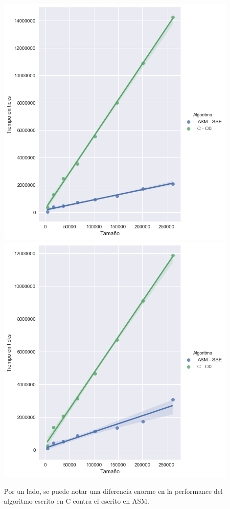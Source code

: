 \begin{center}
\includegraphics[scale=0.5]{img/rgb2yuv_CvsASM.png}
\includegraphics[scale=0.5]{img/yuv2rgb_CvsASM.png}
\end{center}

Por un lado, se puede notar una diferencia enorme en la performance del algoritmo escrito en C contra el escrito en ASM.

